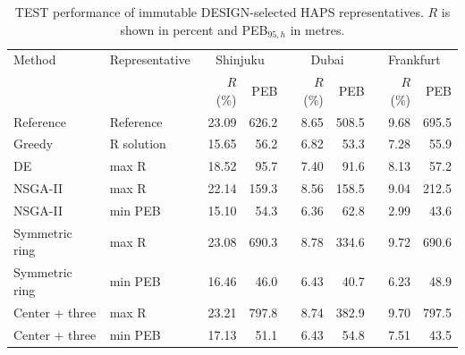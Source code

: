 \begin{table}[t]
\centering
\caption{TEST performance of immutable DESIGN-selected HAPS representatives. $R$ is shown in percent and PEB$_{95,h}$ in metres.}
\label{tab:camera_ready_results}
\begin{tabular}{llrrrrrr}
\hline
Method & Representative & \multicolumn{2}{c}{Shinjuku} & \multicolumn{2}{c}{Dubai} & \multicolumn{2}{c}{Frankfurt} \\
 & & $R$ (\%) & PEB & $R$ (\%) & PEB & $R$ (\%) & PEB \\
\hline
Reference & Reference & 23.09 & 626.2 & 8.65 & 508.5 & 9.68 & 695.5 \\
Greedy & R solution & 15.65 & 56.2 & 6.82 & 53.3 & 7.28 & 55.9 \\
DE & max R & 18.52 & 95.7 & 7.40 & 91.6 & 8.13 & 57.2 \\
NSGA-II & max R & 22.14 & 159.3 & 8.56 & 158.5 & 9.04 & 212.5 \\
NSGA-II & min PEB & 15.10 & 54.3 & 6.36 & 62.8 & 2.99 & 43.6 \\
Symmetric ring & max R & 23.08 & 690.3 & 8.78 & 334.6 & 9.72 & 690.6 \\
Symmetric ring & min PEB & 16.46 & 46.0 & 6.43 & 40.7 & 6.23 & 48.9 \\
Center + three & max R & 23.21 & 797.8 & 8.74 & 382.9 & 9.70 & 797.5 \\
Center + three & min PEB & 17.13 & 51.1 & 6.43 & 54.8 & 7.51 & 43.5 \\
\hline
\end{tabular}
\end{table}
